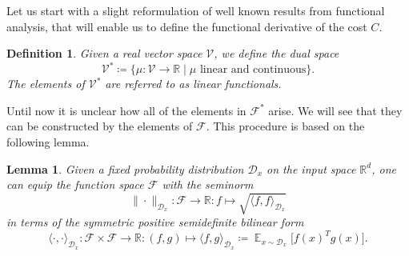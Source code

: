 \documentclass[11pt, a4paper]{article}
\newtheorem{lemma}[theorem]{Lemma}
\newtheorem{definition}[theorem]{Definition}
\newcommand{\R}{\mathds{R}}
\newcommand{\D}{\mathcal{D}}
\newcommand{\F}{\mathcal{F}}
\DeclareMathOperator*{\E}{\mathds{E}}
\begin{document}
Let us start with a slight reformulation of well known results from functional analysis, that will enable us to define the functional derivative of the cost $C$.

\begin{definition}
Given a real vector space $\mathcal{V}$, we define the dual space
\[ \mathcal{V}^* \coloneq \Big \{ \mu : \mathcal{V} \to \R \mid \mu \text{ linear and continuous} \Big \}. \]
The elements of $\mathcal{V}^*$ are referred to as linear functionals.
\end{definition}

Until now it is unclear how all of the elements in $\F^*$ arise. We will see that they can be constructed by the elements of $\F$. This procedure is based on the following lemma.

\begin{lemma}
Given a fixed probability distribution $\D_x$ on the input space $\R^d$, one can equip the function space $\F$ with the seminorm
\[ \| \cdot \|_{\D_x} : \F \to \R : f \mapsto \sqrt{\langle f , f \rangle_{\D_x}} \] 
in terms of the symmetric positive semidefinite bilinear form
\[ \langle \cdot,\cdot \rangle_{\D_x} : \F \times \F \to \R : (f,g) \mapsto \langle f,g \rangle_{\D_x} \coloneq \E_{x \sim \D_x} \Big [ f(x)^Tg(x) \Big ].\]
\end{lemma}
\end{document}
